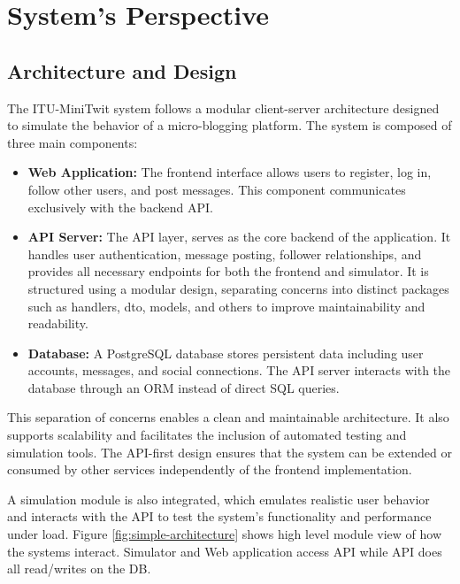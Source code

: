 \section{System's Perspective}

\subsection{Architecture and Design}
The ITU-MiniTwit system follows a modular client-server architecture designed to simulate the behavior of a micro-blogging platform. The system is composed of three main components:

\begin{itemize}
  \item \textbf{Web Application:} The frontend interface allows users to register, log in, follow other users, and post messages. This component communicates exclusively with the backend API.
  
  \item \textbf{API Server:} The API layer, serves as the core backend of the application. It handles user authentication, message posting, follower relationships, and provides all necessary endpoints for both the frontend and simulator. It is structured using a modular design, separating concerns into distinct packages such as handlers, dto, models, and others to improve maintainability and readability.
  
  \item \textbf{Database:} A PostgreSQL database stores persistent data including user accounts, messages, and social connections. The API server interacts with the database through an ORM instead of direct SQL queries.
\end{itemize}

This separation of concerns enables a clean and maintainable architecture. It also supports scalability and facilitates the inclusion of automated testing and simulation tools. The API-first design ensures that the system can be extended or consumed by other services independently of the frontend implementation.

A simulation module is also integrated, which emulates realistic user behavior and interacts with the API to test the system's functionality and performance under load. Figure \ref{fig:simple-architecture} shows high level module view of how the systems interact. Simulator and Web application access API while API does all read/writes on the DB. 

